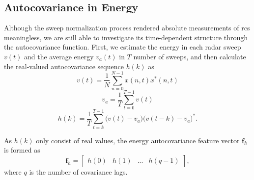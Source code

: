 \subsection{Autocovariance in Energy}

Although the sweep normalization process rendered absolute measurements of \gls{rcs} meaningless, we are still able to investigate its time-dependent structure through the autocovariance function. First, we estimate the energy in each radar sweep $v(t)$ and the average energy $v_a(t)$ in $T$ number of sweeps, and then calculate the real-valued autocovariance sequence $h(k)$ as 
\begin{equation}
	v(t) = \frac{1}{N}\sum_{n=0}^{N-1}x(n,t)x^*(n,t)
\end{equation}
\begin{equation} 
	v_a = \frac{1}{T}\sum_{t=0}^{T-1}v(t)
\end{equation}
\begin{equation}
	h(k) = \frac{1}{T}\sum_{t=k}^{T-1}\big(v(t) - v_a\big)\big(v(t-k) - v_a\big)^*.
\end{equation}

As $h(k)$ only consist of real values, the energy autocovariance feature vector $\mathbf{f}_{h}$ is formed as
\begin{equation}
	\mathbf{f}_{h} = 
	\begin{bmatrix}
		h(0) & h(1) & ... & h(q-1)
	\end{bmatrix},
\end{equation}
where $q$ is the number of covariance lags. 




